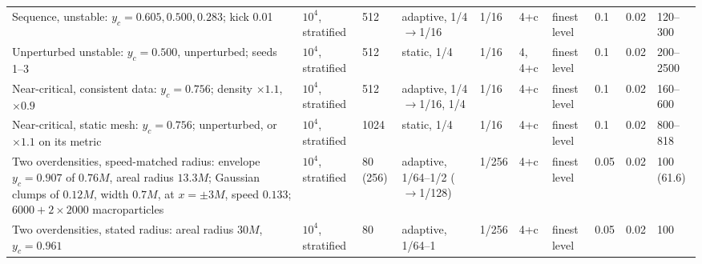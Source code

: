 \begin{table}
\begin{ruledtabular}
\begin{tabular}{p{}p{}p{}p{}p{}p{}p{}p{}p{}p{}}
\raggedright Sequence, unstable: $y_c=0.605, 0.500, 0.283$; kick 0.01 & \raggedright $10^4$, stratified & \raggedright 512 & \raggedright adaptive, 1/4$\to$1/16 & \raggedright 1/16 & \raggedright 4+c & \raggedright finest level & \raggedright 0.1 & \raggedright 0.02 & \raggedright 120--300 \tabularnewline
\raggedright Unperturbed unstable: $y_c=0.500$, unperturbed; seeds 1--3 & \raggedright $10^4$, stratified & \raggedright 512 & \raggedright static, 1/4 & \raggedright 1/16 & \raggedright 4, 4+c & \raggedright finest level & \raggedright 0.1 & \raggedright 0.02 & \raggedright 200--2500 \tabularnewline
\raggedright Near-critical, consistent data: $y_c=0.756$; density $\times1.1$, $\times0.9$ & \raggedright $10^4$, stratified & \raggedright 512 & \raggedright adaptive, 1/4$\to$1/16, 1/4 & \raggedright 1/16 & \raggedright 4+c & \raggedright finest level & \raggedright 0.1 & \raggedright 0.02 & \raggedright 160--600 \tabularnewline
\raggedright Near-critical, static mesh: $y_c=0.756$; unperturbed, or $\times1.1$ on its metric & \raggedright $10^4$, stratified & \raggedright 1024 & \raggedright static, 1/4 & \raggedright 1/16 & \raggedright 4+c & \raggedright finest level & \raggedright 0.1 & \raggedright 0.02 & \raggedright 800--818 \tabularnewline
\raggedright Two overdensities, speed-matched radius: envelope $y_c=0.907$ of $0.76M$, areal radius $13.3M$; Gaussian clumps of $0.12M$, width $0.7M$, at $x=\pm3M$, speed $0.133$; $6000+2\times2000$ macroparticles & \raggedright $10^4$, stratified & \raggedright 80 (256) & \raggedright adaptive, 1/64--1/2 ($\to$1/128)\footnotemark[5] & \raggedright 1/256 & \raggedright 4+c & \raggedright finest level & \raggedright 0.05\footnotemark[6] & \raggedright 0.02 & \raggedright 100 (61.6) \tabularnewline
\raggedright Two overdensities, stated radius: areal radius $30M$, $y_c=0.961$ & \raggedright $10^4$, stratified & \raggedright 80 & \raggedright adaptive, 1/64--1\footnotemark[5] & \raggedright 1/256 & \raggedright 4+c & \raggedright finest level & \raggedright 0.05\footnotemark[6] & \raggedright 0.02 & \raggedright 100 \tabularnewline
\end{tabular}
\end{ruledtabular}

\end{table}
